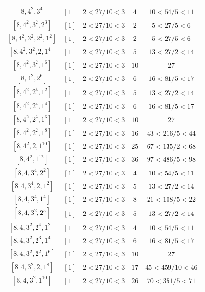 \documentclass{article}%
\begin{document}
\begin{center}
\begin{longtable}{||c|c|c|c|c||}
$[8, 4^{2}, 3^{4}]$ & $[1]$ & $2 < 27/10 < 3$ & $4$ & $10 < 54/5 < 11$ \\ \hline 
$[8, 4^{2}, 3^{2}, 2^{3}]$ & $[1]$ & $2 < 27/10 < 3$ & $2$ & $5 < 27/5 < 6$ \\ \hline 
$[8, 4^{2}, 3^{2}, 2^{2}, 1^{2}]$ & $[1]$ & $2 < 27/10 < 3$ & $2$ & $5 < 27/5 < 6$ \\ \hline 
$[8, 4^{2}, 3^{2}, 2, 1^{4}]$ & $[1]$ & $2 < 27/10 < 3$ & $5$ & $13 < 27/2 < 14$ \\ \hline 
$[8, 4^{2}, 3^{2}, 1^{6}]$ & $[1]$ & $2 < 27/10 < 3$ & $10$ & $27$ \\ \hline 
$[8, 4^{2}, 2^{6}]$ & $[1]$ & $2 < 27/10 < 3$ & $6$ & $16 < 81/5 < 17$ \\ \hline 
$[8, 4^{2}, 2^{5}, 1^{2}]$ & $[1]$ & $2 < 27/10 < 3$ & $5$ & $13 < 27/2 < 14$ \\ \hline 
$[8, 4^{2}, 2^{4}, 1^{4}]$ & $[1]$ & $2 < 27/10 < 3$ & $6$ & $16 < 81/5 < 17$ \\ \hline 
$[8, 4^{2}, 2^{3}, 1^{6}]$ & $[1]$ & $2 < 27/10 < 3$ & $10$ & $27$ \\ \hline 
$[8, 4^{2}, 2^{2}, 1^{8}]$ & $[1]$ & $2 < 27/10 < 3$ & $16$ & $43 < 216/5 < 44$ \\ \hline 
$[8, 4^{2}, 2, 1^{10}]$ & $[1]$ & $2 < 27/10 < 3$ & $25$ & $67 < 135/2 < 68$ \\ \hline 
$[8, 4^{2}, 1^{12}]$ & $[1]$ & $2 < 27/10 < 3$ & $36$ & $97 < 486/5 < 98$ \\ \hline 
$[8, 4, 3^{4}, 2^{2}]$ & $[1]$ & $2 < 27/10 < 3$ & $4$ & $10 < 54/5 < 11$ \\ \hline 
$[8, 4, 3^{4}, 2, 1^{2}]$ & $[1]$ & $2 < 27/10 < 3$ & $5$ & $13 < 27/2 < 14$ \\ \hline 
$[8, 4, 3^{4}, 1^{4}]$ & $[1]$ & $2 < 27/10 < 3$ & $8$ & $21 < 108/5 < 22$ \\ \hline 
$[8, 4, 3^{2}, 2^{5}]$ & $[1]$ & $2 < 27/10 < 3$ & $5$ & $13 < 27/2 < 14$ \\ \hline 
$[8, 4, 3^{2}, 2^{4}, 1^{2}]$ & $[1]$ & $2 < 27/10 < 3$ & $4$ & $10 < 54/5 < 11$ \\ \hline 
$[8, 4, 3^{2}, 2^{3}, 1^{4}]$ & $[1]$ & $2 < 27/10 < 3$ & $6$ & $16 < 81/5 < 17$ \\ \hline 
$[8, 4, 3^{2}, 2^{2}, 1^{6}]$ & $[1]$ & $2 < 27/10 < 3$ & $10$ & $27$ \\ \hline 
$[8, 4, 3^{2}, 2, 1^{8}]$ & $[1]$ & $2 < 27/10 < 3$ & $17$ & $45 < 459/10 < 46$ \\ \hline 
$[8, 4, 3^{2}, 1^{10}]$ & $[1]$ & $2 < 27/10 < 3$ & $26$ & $70 < 351/5 < 71$ \\ \hline 

\end{longtable}
\end{center}
\end{document}
